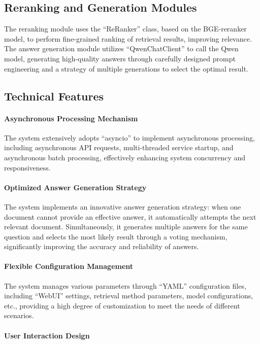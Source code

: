 \documentclass[twoside]{article}
\begin{document}
\subsection{Reranking and Generation Modules}
The reranking module uses the ``ReRanker'' class, based on the BGE-reranker model, to perform fine-grained ranking of retrieval results, improving relevance. The answer generation module utilizes ``QwenChatClient'' to call the Qwen model, generating high-quality answers through carefully designed prompt engineering and a strategy of multiple generations to select the optimal result.

\subsection{Technical Features}
\paragraph*{Asynchronous Processing Mechanism}
The system extensively adopts ``asyncio'' to implement asynchronous processing, including asynchronous API requests, multi-threaded service startup, and asynchronous batch processing, effectively enhancing system concurrency and responsiveness.

\paragraph*{Optimized Answer Generation Strategy}
The system implements an innovative answer generation strategy: when one document cannot provide an effective answer, it automatically attempts the next relevant document. Simultaneously, it generates multiple answers for the same question and selects the most likely result through a voting mechanism, significantly improving the accuracy and reliability of answers.

\paragraph*{Flexible Configuration Management}
The system manages various parameters through ``YAML'' configuration files, including ``WebUI'' settings, retrieval method parameters, model configurations, etc., providing a high degree of customization to meet the needs of different scenarios.

\paragraph*{User Interaction Design}



\end{document}
